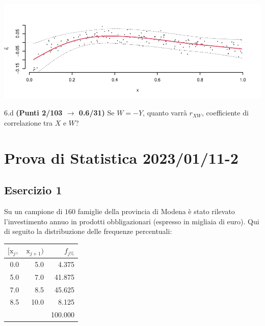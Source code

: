 \documentclass[
  11pt,
]{book}
\theoremstyle{mytheoremstyle}
\theoremstyle{mydefstyle}
\newenvironment{sol}
  {
  \begin{tcolorbox}[enhanced,breakable,arc=0.1mm,boxrule=1pt,colback=white,colframe=iblue,
  title=\bf \fontfamily{lmss}\selectfont \hspace{.5 cm} Soluzione,drop fuzzy shadow]

}{
\end{tcolorbox}
  }
\begin{document}
\begin{sol}

\begin{center}\includegraphics{Esami_passati_con_soluzioni_files/figure-latex/2023-5,-1} \end{center}

\end{sol}

6.d \textbf{(Punti 2/103 \(\rightarrow\) 0.6/31)} Se \(W=- Y\), quanto varrà \(r_{XW}\), coefficiente di correlazione tra \(X\) e \(W\)?

\section{Prova di Statistica 2023/01/11-2}\label{prova-di-statistica-20230111-2}

\subsection{Esercizio 1}\label{esercizio-1-20}

Su un campione di \(160\) famiglie della provincia di Modena è stato rilevato l'investimento annuo in prodotti obbligazionari (espresso in migliaia di euro). Qui di seguito la distribuzione delle frequenze percentuali:

\begin{sol}

\begin{table}[H]
\centering
\begin{tabular}{rrr}
\toprule
$[\text{x}_j,$ & $\text{x}_{j+1})$ & $f_{j\%}$\\
\midrule
0.0 & 5.0 & 4.375\\
5.0 & 7.0 & 41.875\\
7.0 & 8.5 & 45.625\\
8.5 & 10.0 & 8.125\\
 &  & 100.000\\
\bottomrule
\end{tabular}
\end{table}

\end{sol}
\end{document}
